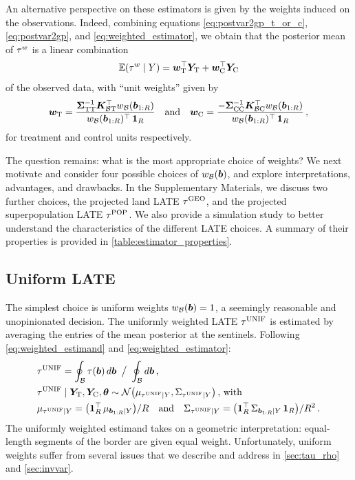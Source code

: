 \documentclass[12pt]{article}
\begin{document}
An alternative perspective on these estimators is given by the weights induced on the observations.
Indeed, combining equations \autoref{eq:postvar2gp_t_or_c}, \autoref{eq:postvar2gp}, and \autoref{eq:weighted_estimator}, we obtain that the posterior mean of \(\tau^{w}\) is a linear combination
\begin{equation}
    \E\del{\tauw \mid Y} = \wt\trans \yt + \wc\trans \yc
    \label{eq:unit_weights}
\end{equation}
of the observed data, with ``unit weights'' given by
\begin{equation}
        \bm{w}_{\mathrm{T}} = \frac{
            \bm{\Sigma}_{\mathrm{T} \mathrm{T}}^{-1} 
            \bm{K}_{\mathcal{B} \mathrm{T}}^{\top} w_{\mathcal{B}}(\bm{b}_{1:R})
        }{
            w_{\mathcal{B}}(\bm{b}_{1:R})^{\top} \operatorname{\mathbf{1}}_{R}
        }
        \quad\text{and}\quad
        \bm{w}_{\mathrm{C}} = \frac{
            -
            \bm{\Sigma}_{\mathrm{C} \mathrm{C}}^{-1} 
            \bm{K}_{\mathcal{B} \mathrm{C}}^{\top} w_{\mathcal{B}}(\bm{b}_{1:R})
        }{
            w_{\mathcal{B}}(\bm{b}_{1:R})^{\top} \operatorname{\mathbf{1}}_{R}
        }
        \,,
    \label{eq:unit_weights_gp}
\end{equation}
for treatment and control units respectively.

The question remains: what is the most appropriate choice of weights?
We next motivate and consider four possible choices of \(w_{\mathcal{B}}(\bm{b})\), and explore interpretations, advantages, and drawbacks. 
In the Supplementary Materials, we discuss two further choices, the projected land LATE \(\tau^{\mathrm{GEO}}\), and the projected superpopulation LATE \(\tau^{\mathrm{POP}}\).
We also provide a simulation study to better understand the characteristics of the different LATE choices.
A summary of their properties is provided in \autoref{table:estimator_properties}.

\subsection{Uniform LATE}
The simplest choice is uniform weights \(w_{\mathcal{B}}(\bm{b})=1\), a seemingly reasonable and unopinionated decision.
The uniformly weighted LATE \(\tau^{\mathrm{UNIF}}\) is estimated by averaging the entries of the mean posterior at the sentinels.
Following \autoref{eq:weighted_estimand} and \autoref{eq:weighted_estimator}:
\begin{equation}\begin{split}
    &\unifavg = \oint_\border \tau(\sentinel) \dif\sentinel
        \ \big/ \ 
        \oint_\border \dif{\sentinel}  \,, \\
    &\unifavg \mid \yt, \yc, \hyperparam \sim \normal\del{\mu_{\unifavg \mid Y}, \Sigma_{\unifavg \mid Y}}\,\text{, with} \\
    &\mu_{\unifavg \mid Y} = \del{\ones_{\numsent}\trans \mu_{\sentinels \mid Y}} / \numsent \quad\text{and}\quad
    \Sigma_{\unifavg \mid Y} = \del{\ones_{\numsent}\trans \Sigma_{\sentinels \mid Y} \ones_{\numsent}} / \numsent^2 \,.
\end{split}
\label{eq:unifavg}
\end{equation}
The uniformly weighted estimand takes on a geometric interpretation: equal-length segments of the border are given equal weight.
Unfortunately, uniform weights suffer from several issues that we describe and address in \autoref{sec:tau_rho} and \autoref{sec:invvar}.
\end{document}
